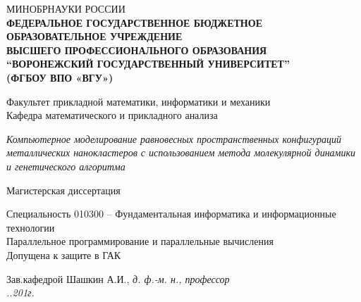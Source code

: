 %
%
\begin{titlepage}

\thispagestyle{empty} %
\begin{center}
 МИНОБРНАУКИ РОССИИ \\
{\bf {\small ФЕДЕРАЛЬНОЕ ГОСУДАРСТВЕННОЕ БЮДЖЕТНОЕ ОБРАЗОВАТЕЛЬНОЕ УЧРЕЖДЕНИЕ \\
ВЫСШЕГО ПРОФЕССИОНАЛЬНОГО ОБРАЗОВАНИЯ} \\
“ВОРОНЕЖСКИЙ ГОСУДАРСТВЕННЫЙ УНИВЕРСИТЕТ”\\
(ФГБОУ ВПО «ВГУ»)}
\end{center}

\vspace{1mm}

\begin{center}
 Факультет прикладной математики, информатики и механики\\
 Кафедра математического и прикладного анализа\\
\end{center}
\vspace{7mm}
\begin{center}
{\it Компьютерное моделирование равновесных пространственных конфигураций
     металлических нанокластеров с использованием метода молекулярной
     динамики и генетического алгоритма}
\end{center}
\vspace{4mm}
\begin{center}
{Магистерская диссертация\/}
\end{center}
\vspace{8mm}
\begin{flushleft}
Специальность 010300 – Фундаментальная информатика и информационные технологии \\
Параллельное программирование и параллельные вычисления\\
\vspace{8mm}
Допущена к защите в ГАК
\end{flushleft}
\vspace{1mm}
\begin{flushleft}
Зав.кафедрой \underline{\hspace{30mm}} Шашкин А.И., {\it д. ф.-м. н., профессор}\\
{\it\underline{\hspace{10mm}}.\underline{\hspace{10mm}}.201\underline{\hspace{5mm}}г.}\\

\end{flushleft}
\end{titlepage}
